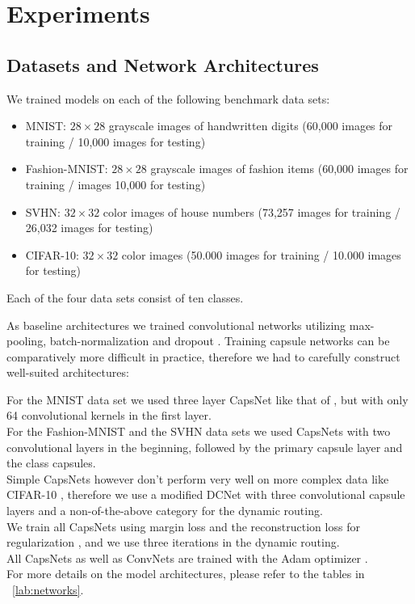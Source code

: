 
\section{Experiments}

\subsection{Datasets and Network Architectures}




 
 We trained models on each of the following benchmark data sets:

\begin{itemize}
	\item MNIST: $28\times28$ grayscale images of handwritten digits (60,000  images for training / 10,000  images for testing) \cite{mnist}
	\item Fashion-MNIST:  $28\times28$ grayscale images of fashion items (60,000 images for training / images 10,000 for testing) \cite{fashion}
	\item SVHN: $32\times32$ color images of house numbers (73,257  images for training / 26,032 images for testing) \cite{svhn}
	\item CIFAR-10: $32\times32$ color images (50.000  images for training / 10.000  images for testing) \cite{cifar}
\end{itemize}

Each of the four data sets consist of ten classes.

As baseline architectures we trained convolutional networks utilizing max-pooling,
batch-normalization \citep{batchnorm} and dropout \citep{dropout}.
Training capsule networks can be comparatively more difficult in practice, therefore we had to carefully construct well-suited architectures:

For the MNIST data set we used three layer CapsNet like that of \citet{capsules}, but with only 64 convolutional kernels in the first layer. \\
For the Fashion-MNIST and the SVHN data sets we used CapsNets with two convolutional layers in the beginning, followed by the primary capsule layer and the class capsules. \\
Simple CapsNets however don't perform very well on more complex data like CIFAR-10 \citep{complex}, therefore we use a modified DCNet \citep{denseanddiverse} with three convolutional capsule layers and a non-of-the-above category for the dynamic routing. \\
We train all CapsNets using margin loss and the reconstruction loss for regularization \citep{capsules}, and we use three iterations in the dynamic routing. \\
All CapsNets as well as ConvNets are trained with the Adam optimizer \citep{adam}. \\
For more details on the model architectures, please refer to the tables in ~\ref{lab:networks}.

